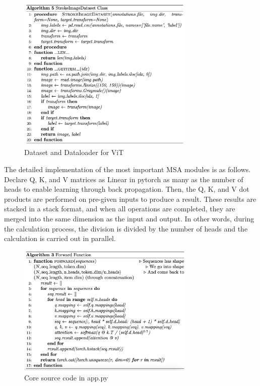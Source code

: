 \begin{figure}[H]
    \centering
    \includegraphics[width=8.5cm]{images/Dataset.png}
    \caption{Dataset and Dataloader for ViT}
    \label{fig:enter-label}
\end{figure}

The detailed implementation of the most important MSA modules is as follows. Declare Q, K, and V matrices as Linear in pytorch as many as the number of heads to enable learning through back propagation. Then, the Q, K, and V dot products are performed on pre-given inputs to produce a result. These results are stacked in a stack format, and when all operations are completed, they are merged into the same dimension as the input and output. In other words, during the calculation process, the division is divided by the number of heads and the calculation is carried out in parallel.

\begin{figure}[H]
    \centering
    \includegraphics[width=8.5cm]{images/vit forward.png}
    \caption{Core source code in app.py}
    \label{fig:enter-label}
\end{figure}


